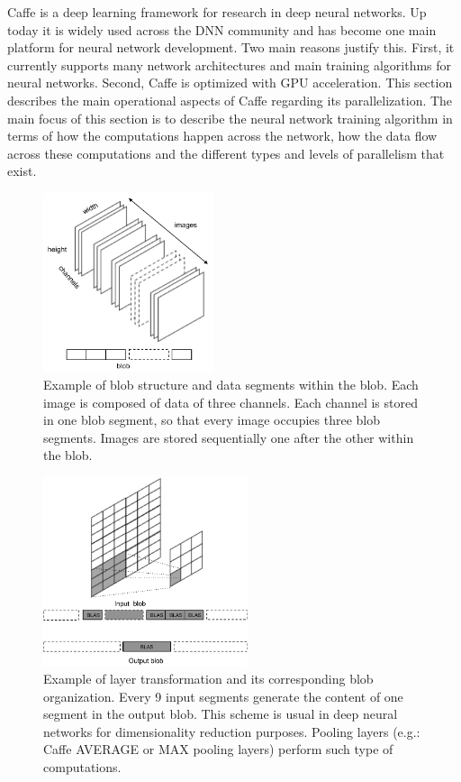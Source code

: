 Caffe is a deep learning framework for research in deep neural
networks. Up today it is widely used across the DNN community
and has become one main platform for neural network development. 
Two main reasons justify this. First, it currently supports
many network architectures and main training algorithms for
neural networks. Second, Caffe is optimized with GPU acceleration.
This section describes the main operational aspects of Caffe
regarding its parallelization. 
The main focus of this section is to describe the neural network 
training algorithm in terms of how the computations happen across 
the network, how the data flow across these computations 
and the different types and levels of parallelism that exist.

\begin{figure}[]
\centering
\includegraphics[width=5cm]{figures/blob1.pdf}
\caption{Example of blob structure and data segments within the blob. Each image is composed of data of three channels. Each channel is stored in one blob segment, so that every image occupies three blob segments. Images are stored sequentially one after the other within the blob.}
\label{fig-blob}
\end{figure}
\begin{figure}[]
\centering
\includegraphics[width=6cm]{figures/blob2.pdf}
\caption{Example of layer transformation and its corresponding blob organization. Every 9 input segments generate the content of one segment in the output blob. This scheme is usual in deep neural networks for dimensionality reduction purposes. Pooling layers (e.g.: Caffe AVERAGE or MAX pooling layers) perform such type of computations.}
\label{fig-blob-trans}
\end{figure}

